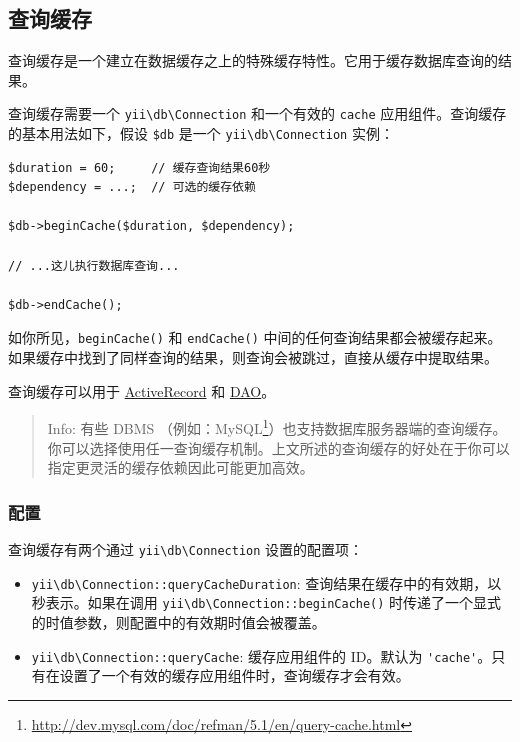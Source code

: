 \subsection{查询缓存 \label{caching-data.md::query-caching}}
查询缓存是一个建立在数据缓存之上的特殊缓存特性。它用于缓存数据库查询的结果。

查询缓存需要一个 \texttt{yii{\allowbreak{}\textbackslash}db{\allowbreak{}\textbackslash}Connection} 和一个有效的 \lstinline|cache| 应用组件。查询缓存的基本用法如下，假设 \lstinline|$db| 是一个 \texttt{yii{\allowbreak{}\textbackslash}db{\allowbreak{}\textbackslash}Connection} 实例：

\lstset{language=php}\begin{lstlisting}
$duration = 60;     // 缓存查询结果60秒
$dependency = ...;  // 可选的缓存依赖

$db->beginCache($duration, $dependency);

// ...这儿执行数据库查询...

$db->endCache();
\end{lstlisting}
如你所见，\lstinline|beginCache()| 和 \lstinline|endCache()| 中间的任何查询结果都会被缓存起来。如果缓存中找到了同样查询的结果，则查询会被跳过，直接从缓存中提取结果。

查询缓存可以用于 \hyperref[db-active-record.md]{ActiveRecord} 和 \hyperref[db-dao.md]{DAO}。

\begin{quote}Info: 有些 DBMS （例如：MySQL\footnote{\url{http://dev.mysql.com/doc/refman/5.1/en/query-cache.html}}）也支持数据库服务器端的查询缓存。你可以选择使用任一查询缓存机制。上文所述的查询缓存的好处在于你可以指定更灵活的缓存依赖因此可能更加高效。

\end{quote}
\subsubsection{配置 \label{caching-data.md::query-caching-configs}}
查询缓存有两个通过 \texttt{yii{\allowbreak{}\textbackslash}db{\allowbreak{}\textbackslash}Connection} 设置的配置项：

\begin{itemize}
\item \texttt{yii{\allowbreak{}\textbackslash}db{\allowbreak{}\textbackslash}Connection\allowbreak{}::\allowbreak{}queryCacheDuration}: 查询结果在缓存中的有效期，以秒表示。如果在调用 \texttt{yii{\allowbreak{}\textbackslash}db{\allowbreak{}\textbackslash}Connection\allowbreak{}::\allowbreak{}beginCache()} 时传递了一个显式的时值参数，则配置中的有效期时值会被覆盖。
\item \texttt{yii{\allowbreak{}\textbackslash}db{\allowbreak{}\textbackslash}Connection\allowbreak{}::\allowbreak{}queryCache}: 缓存应用组件的 ID。默认为 \lstinline|'cache'|。只有在设置了一个有效的缓存应用组件时，查询缓存才会有效。
\end{itemize}
